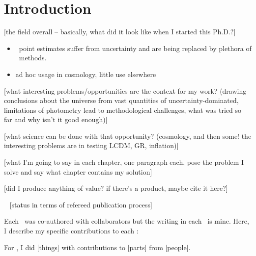 \chapter*{Introduction}

[the field overall -- basically, what did it look like when I started this Ph.D.?]

\begin{itemize}
	\item \Pz\ point estimates suffer from uncertainty and are being replaced by plethora of \pzpdf\ methods.
	\item ad hoc usage in cosmology, little use elsewhere
\end{itemize}

[what interesting problems/opportunities are the context for my work?  (drawing conclusions about the universe from vast quantities of uncertainty-dominated, limitations of photometry lead to methodological challenges, what was tried so far and why isn't it good enough)]

[what science can be done with that opportunity? (cosmology, and then some! the interesting problems are in testing LCDM, GR, inflation)]

[what I'm going to say in each chapter, one paragraph each, pose the problem I solve and say what chapter contains my solution]

[did I produce anything of value? if there's a product, maybe cite it here?]

\chapname~ [status in terms of refereed publication process]

Each \chapname\ was co-authored with collaborators but the writing in each \chapname\ is mine.
Here, I describe my specific contributions to each \chapname:
\begin{enumerate}

{\item For , I did [things] with contributions to [parts] from [people].}

\end{enumerate}
